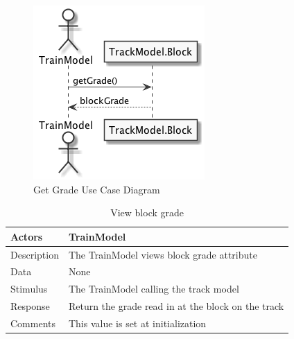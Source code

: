 \documentclass[]{article}
\begin{document}
\begin{figure}[H]
	\centering
	\includegraphics[scale=.5]{getGrade.png}
	\caption{Get Grade Use Case Diagram}
\end{figure}

\begin{table}[H]
	\centering
	\caption{View block grade}
	\begin{tabular}{|l|l|}
		\hline
		Actors & \parbox[t]{10cm}{TrainModel} \\ \hline
		Description & \parbox[t]{10cm}{The TrainModel views block grade attribute} \\ \hline
		Data &  \parbox[t]{10cm}{None} \\ \hline
		Stimulus &  \parbox[t]{10cm}{The TrainModel calling the track model} \\ \hline
		Response & \parbox[t]{10cm}{Return the grade read in at the block on the track}\\ \hline
		Comments & \parbox[t]{10cm}{This value is set at initialization}  \\ \hline
	\end{tabular}
\end{table}
\end{document}
